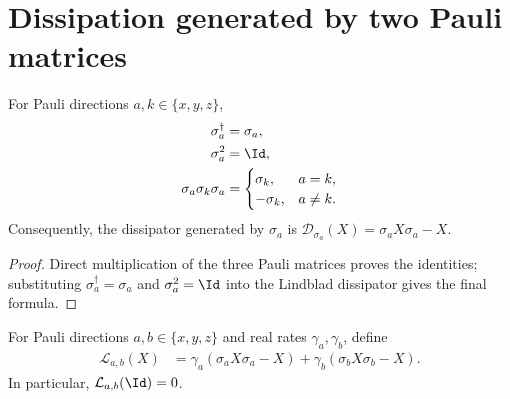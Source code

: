 \section{Dissipation generated by two Pauli matrices}
\label{sec:two_pauli_dissipation}

\begin{theorem}
    \label{thm:pauli_conjugation_identities}
    \leanok
    For Pauli directions $a,k\in\{x,y,z\}$,
    \begin{align}
        \sigma_a^\dagger&=\sigma_a,
        \notag\\
        \sigma_a^2&=\Id,
        \notag\\
        \sigma_a\sigma_k\sigma_a
        &=
        \begin{cases}
            \sigma_k,&a=k,\\
            -\sigma_k,&a\ne k.
        \end{cases}
        \notag
    \end{align}
    Consequently, the dissipator generated by $\sigma_a$ is
    $\mathcal D_{\sigma_a}(X)=\sigma_aX\sigma_a-X$.
\end{theorem}

\begin{proof}
    \leanok
    Direct multiplication of the three Pauli matrices proves the identities;
    substituting $\sigma_a^\dagger=\sigma_a$ and $\sigma_a^2=\Id$ into the
    Lindblad dissipator gives the final formula.
\end{proof}

\begin{definition}
    \label{def:two_pauli_generator}
    \leanok
    For Pauli directions $a,b\in\{x,y,z\}$ and real rates
    $\gamma_a,\gamma_b$, define
    \begin{align}
        \mathcal L_{a,b}(X)
        &=
        \gamma_a(\sigma_aX\sigma_a-X)
        +\gamma_b(\sigma_bX\sigma_b-X).
        \label{eq:semigroup_two_pauli_generator}
    \end{align}
    In particular, $\mathcal L_{a,b}(\Id)=0$.
\end{definition}


